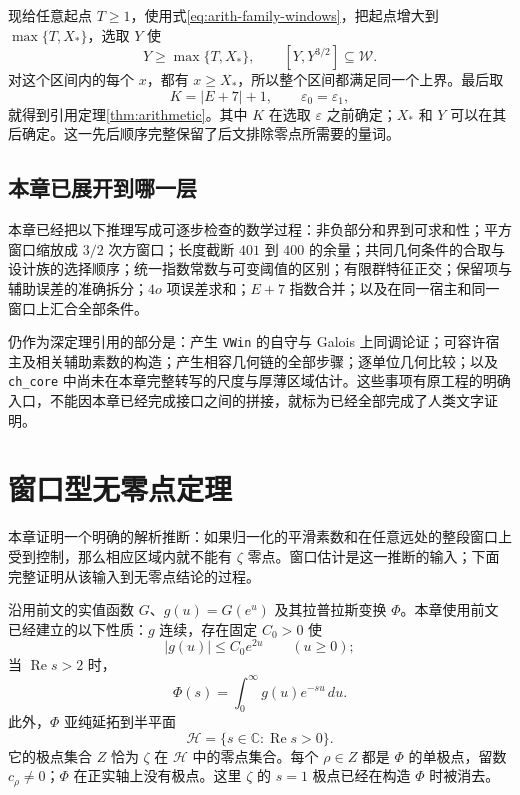 \documentclass[UTF8,fontset=fandol,a4paper,openany,oneside]{ctexbook}
\theoremstyle{definition}
\theoremstyle{remark}
\begin{document}
现给任意起点 $T\ge1$，使用式\eqref{eq:arith-family-windows}，把起点增大到 $\max\{T,X_*\}$，选取 $Y$ 使
\[
Y\ge\max\{T,X_*\},
\qquad[Y,Y^{3/2}]\subseteq\mathcal W.
\]
对这个区间内的每个 $x$，都有 $x\ge X_*$，所以整个区间都满足同一个上界。最后取
\[
K=|E+7|+1,\qquad\varepsilon_0=\varepsilon_1,
\]
就得到引用定理\ref{thm:arithmetic}。其中 $K$ 在选取 $\varepsilon$ 之前确定；$X_*$ 和 $Y$ 可以在其后确定。这一先后顺序完整保留了后文排除零点所需要的量词。

\section{本章已展开到哪一层}
本章已经把以下推理写成可逐步检查的数学过程：非负部分和界到可求和性；平方窗口缩放成 $3/2$ 次方窗口；长度截断 $401$ 到 $400$ 的余量；共同几何条件的合取与设计族的选择顺序；统一指数常数与可变阈值的区别；有限群特征正交；保留项与辅助误差的准确拆分；$4o$ 项误差求和；$E+7$ 指数合并；以及在同一宿主和同一窗口上汇合全部条件。

仍作为深定理引用的部分是：产生 \texttt{VWin} 的自守与 Galois 上同调论证；可容许宿主及相关辅助素数的构造；产生相容几何链的全部步骤；逐单位几何比较；以及 \texttt{ch\_core} 中尚未在本章完整转写的尺度与厚薄区域估计。这些事项有原工程的明确入口，不能因本章已经完成接口之间的拼接，就标为已经全部完成了人类文字证明。



\chapter{窗口型无零点定理}
\label{chap:window-proof}
\label{chap:window}

本章证明一个明确的解析推断：如果归一化的平滑素数和在任意远处的整段窗口上受到控制，那么相应区域内就不能有 $\zeta$ 零点。窗口估计是这一推断的输入；下面完整证明从该输入到无零点结论的过程。

沿用前文的实值函数 $G$、$g(u)=G(e^u)$ 及其拉普拉斯变换 $\Phi$。本章使用前文已经建立的以下性质：$g$ 连续，存在固定 $C_0>0$ 使
\begin{equation}
 |g(u)|\le C_0e^{2u}\qquad(u\ge0);
 \label{eq:win-growth}
\end{equation}
当 $\operatorname{Re}s>2$ 时，
\begin{equation}
 \Phi(s)=\int_0^\infty g(u)e^{-su}\,du.
 \label{eq:win-laplace}
\end{equation}
此外，$\Phi$ 亚纯延拓到半平面
\[
 \mathcal H=\{s\in\mathbb C:\operatorname{Re}s>0\}.
\]
它的极点集合 $Z$ 恰为 $\zeta$ 在 $\mathcal H$ 中的零点集合。每个 $\rho\in Z$ 都是 $\Phi$ 的单极点，留数 $c_\rho\ne0$；$\Phi$ 在正实轴上没有极点。这里 $\zeta$ 的 $s=1$ 极点已经在构造 $\Phi$ 时被消去。
\end{document}
